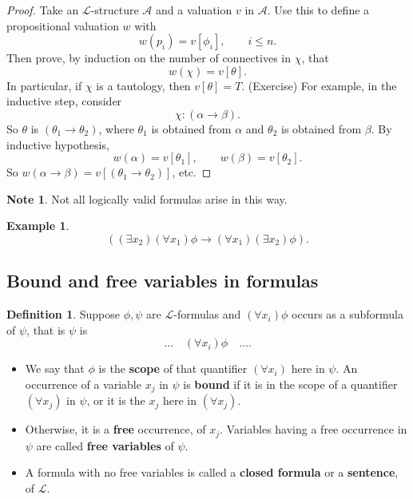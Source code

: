 \documentclass{article}
\newcommand{\A}{\mathcal{A}}
\renewcommand{\L}{\mathcal{L}}
\newcommand{\rb}[1]{\left( #1 \right)}
\renewcommand{\sb}[1]{\left[ #1 \right]}
\newcommand{\impb}[2]{\rb{#1 \rightarrow #2}}
\newcommand{\fab}[1]{\rb{\forall #1}}
\newcommand{\teb}[1]{\rb{\exists #1}}
\theoremstyle{definition}\newtheorem{definition}{Definition}[subsection]
\theoremstyle{definition}\newtheorem{remark1}[definition]{Remark}
\theoremstyle{definition}\newtheorem{example1}[definition]{Example}
\theoremstyle{definition}\newtheorem*{remark2}{Remark}
\theoremstyle{definition}\newtheorem*{example2}{Example}
\theoremstyle{definition}\newtheorem*{note}{Note}
\theoremstyle{definition}\newtheorem*{notation}{Notation}
\begin{document}

\begin{proof}
Take an $ \L $-structure $ \A $ and a valuation $ v $ in $ \A $. Use this to define a propositional valuation $ w $ with
$$ w\rb{p_i} = v\sb{\phi_i}, \qquad i \le n. $$
Then prove, by induction on the number of connectives in $ \chi $, that
$$ w\rb{\chi} = v\sb{\theta}. $$
In particular, if $ \chi $ is a tautology, then $ v\sb{\theta} = T $. (Exercise) For example, in the inductive step, consider
$$ \chi : \impb{\alpha}{\beta}. $$
So $ \theta $ is $ \impb{\theta_1}{\theta_2} $, where $ \theta_1 $ is obtained from $ \alpha $ and $ \theta_2 $ is obtained from $ \beta $. By inductive hypothesis,
$$ w\rb{\alpha} = v\sb{\theta_1}, \qquad w\rb{\beta} = v\sb{\theta_2}. $$
So $ w\impb{\alpha}{\beta} = v\sb{\impb{\theta_1}{\theta_2}} $, etc.
\end{proof}

\begin{note}
Not all logically valid formulas arise in this way.
\end{note}

\begin{example2}
$$ \impb{\teb{x_2}\fab{x_1}\phi}{\fab{x_1}\teb{x_2}\phi}. $$
\end{example2}

\pagebreak

\subsection{Bound and free variables in formulas}

\begin{definition}
Suppose $ \phi, \psi $ are $ \L $-formulas and $ \fab{x_i}\phi $ occurs as a subformula of $ \psi $, that is $ \psi $ is
$$ \dots \quad \fab{x_i}\phi \quad \dots. $$
\begin{itemize}
\item We say that $ \phi $ is the \textbf{scope} of that quantifier $ \fab{x_i} $ here in $ \psi $. An occurrence of a variable $ x_j $ in $ \psi $ is \textbf{bound} if it is in the scope of a quantifier $ \fab{x_j} $ in $ \psi $, or it is the $ x_j $ here in $ \fab{x_j} $.
\item Otherwise, it is a \textbf{free} occurrence, of $ x_j $. Variables having a free occurrence in $ \psi $ are called \textbf{free variables} of $ \psi $.
\item A formula with no free variables is called a \textbf{closed formula} or a \textbf{sentence}, of $ \L $.
\end{itemize}
\end{definition}
\end{document}
